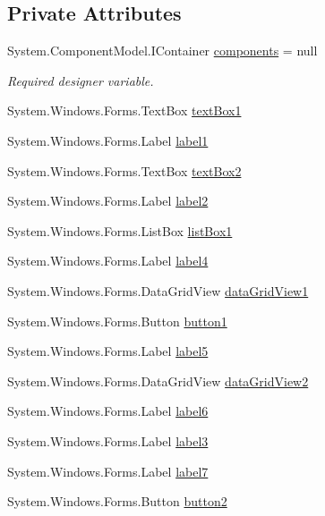 \subsection*{Private Attributes}
\begin{DoxyCompactItemize}
\item 
System.\+Component\+Model.\+I\+Container \hyperlink{classPCO_1_1AthleteForm_a28c2f61e5410b3b09cf5d1b197004dc6}{components} = null
\begin{DoxyCompactList}\small\item\em Required designer variable. \end{DoxyCompactList}\item 
System.\+Windows.\+Forms.\+Text\+Box \hyperlink{classPCO_1_1AthleteForm_a38526b5564c012ff69e9483e489b4a88}{text\+Box1}
\item 
System.\+Windows.\+Forms.\+Label \hyperlink{classPCO_1_1AthleteForm_a1f5940f03f4ba024ef0d91eff986050f}{label1}
\item 
System.\+Windows.\+Forms.\+Text\+Box \hyperlink{classPCO_1_1AthleteForm_a9ff70b94eb61e3b9fdf0d4e9487232af}{text\+Box2}
\item 
System.\+Windows.\+Forms.\+Label \hyperlink{classPCO_1_1AthleteForm_a5adafafd087ea1056db97756730cdd2f}{label2}
\item 
System.\+Windows.\+Forms.\+List\+Box \hyperlink{classPCO_1_1AthleteForm_ad95b133a93920879c4c1d15317965550}{list\+Box1}
\item 
System.\+Windows.\+Forms.\+Label \hyperlink{classPCO_1_1AthleteForm_a7cbb3375a900a2cec9ed587e771e28e6}{label4}
\item 
System.\+Windows.\+Forms.\+Data\+Grid\+View \hyperlink{classPCO_1_1AthleteForm_a8f783d389b6374d76e687f8710cb2572}{data\+Grid\+View1}
\item 
System.\+Windows.\+Forms.\+Button \hyperlink{classPCO_1_1AthleteForm_a86a9772f0dad39f77e94c939ab082981}{button1}
\item 
System.\+Windows.\+Forms.\+Label \hyperlink{classPCO_1_1AthleteForm_ab211ce9c9d2f92c7fc1942bccfd81eb4}{label5}
\item 
System.\+Windows.\+Forms.\+Data\+Grid\+View \hyperlink{classPCO_1_1AthleteForm_ac1f72ee1011c66a130b1da39b893eeca}{data\+Grid\+View2}
\item 
System.\+Windows.\+Forms.\+Label \hyperlink{classPCO_1_1AthleteForm_a23451f23416ff82db23b169b8f08270e}{label6}
\item 
System.\+Windows.\+Forms.\+Label \hyperlink{classPCO_1_1AthleteForm_ace6b3f36933dacffe36ed344aaded395}{label3}
\item 
System.\+Windows.\+Forms.\+Label \hyperlink{classPCO_1_1AthleteForm_ac917335ab96a9e8a148911b2f81e4fc8}{label7}
\item 
System.\+Windows.\+Forms.\+Button \hyperlink{classPCO_1_1AthleteForm_ac0941ee382a48135f96a0199520a6e0f}{button2}
\end{DoxyCompactItemize}


